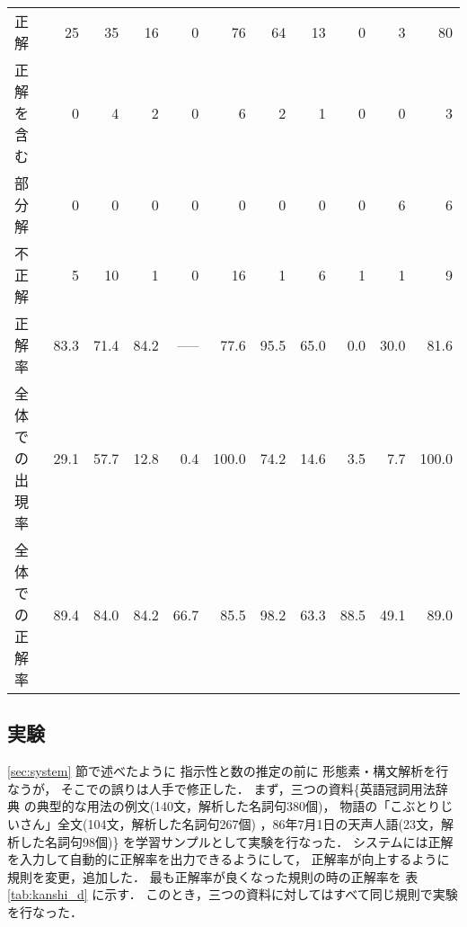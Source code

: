 \begin{table}[t]
\begin{center}
{\begin{tabular}[c]{|l|r|r|r|r|r|r|r|r|r|r|}
   正解   &      25  &     35 &      16  &       0  &    76  &      64  &   13 &       0  &       3  &   80    \\ 
正解を含む&       0  &       4  &       2  &       0  &       6  &       2  &       1  &       0  &       0  &       3   \\ 
  部分解  &       0  &       0  &       0  &       0  &       0   &       0  &       0  &       0  &       6  &       6  \\ 
  不正解  &       5  &      10  &       1  &       0  &      16   &       1  &       6  &       1  &       1  &       9  \\ 
\hline
正解率&    83.3  &    71.4  &    84.2  &    -----  &    77.6   &    95.5  &    65.0  &     0.0  &    30.0  &    81.6   \\ \hline
全体での出現率 &  29.1  &  57.7   &  12.8   &  0.4  &  100.0 &  74.2  &  14.6   &  3.5  &  7.7   & 100.0  \\

全体での正解率 &  89.4  &  84.0   &  84.2   &  66.7   &  85.5  &  98.2  &  63.3   &  88.5  &  49.1   &  89.0   \\ \hline 
\end{tabular}
}
\end{center}
\end{table}

\subsection{実験}

\ref{sec:system} 節で述べたように
指示性と数の推定の前に
形態素・構文解析を行なうが，
そこでの誤りは人手で修正した．
まず，三つの資料\{英語冠詞用法辞典\cite{Kumayama1985}
の典型的な用法の例文(140文，解析した名詞句380個)，
物語の「こぶとりじいさん」\cite{Nakao1985}全文(104文，解析した名詞句267個)
，86年7月1日の天声人語(23文，解析した名詞句98個)\}
を学習サンプルとして実験を行なった．
システムには正解を入力して自動的に正解率を出力できるようにして，
正解率が向上するように規則を変更，追加した．
最も正解率が良くなった規則の時の正解率を
表\ref{tab:kanshi_d} に示す．
このとき，三つの資料に対してはすべて同じ規則で実験を行なった．

